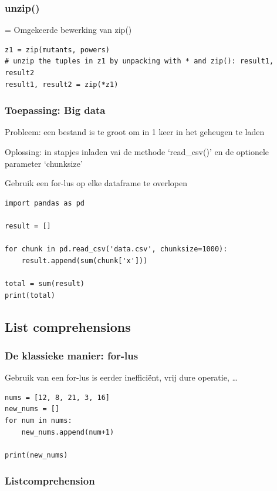 \documentclass{article}
\begin{document}
\subsubsection{unzip()}

= Omgekeerde bewerking van zip()


\begin{verbatim}
z1 = zip(mutants, powers)
# unzip the tuples in z1 by unpacking with * and zip(): result1, result2
result1, result2 = zip(*z1)
\end{verbatim}

\subsubsection{Toepassing: Big data}

Probleem: een bestand is te groot om in 1 keer in het geheugen te laden

Oplossing: in stapjes inladen vai de methode `read\_csv()' en de optionele parameter `chunksize'

Gebruik een for-lus op elke dataframe te overlopen

\begin{verbatim}
import pandas as pd

result = []

for chunk in pd.read_csv('data.csv', chunksize=1000):
    result.append(sum(chunk['x']))

total = sum(result)
print(total)
\end{verbatim}

\subsection{List comprehensions}

\subsubsection{De klassieke manier: for-lus}

Gebruik van een for-lus is eerder inefficiënt, vrij dure operatie, \dots

\begin{verbatim}
nums = [12, 8, 21, 3, 16]
new_nums = []
for num in nums:
    new_nums.append(num+1)

print(new_nums)
\end{verbatim}

\subsubsection{Listcomprehension}
\end{document}
